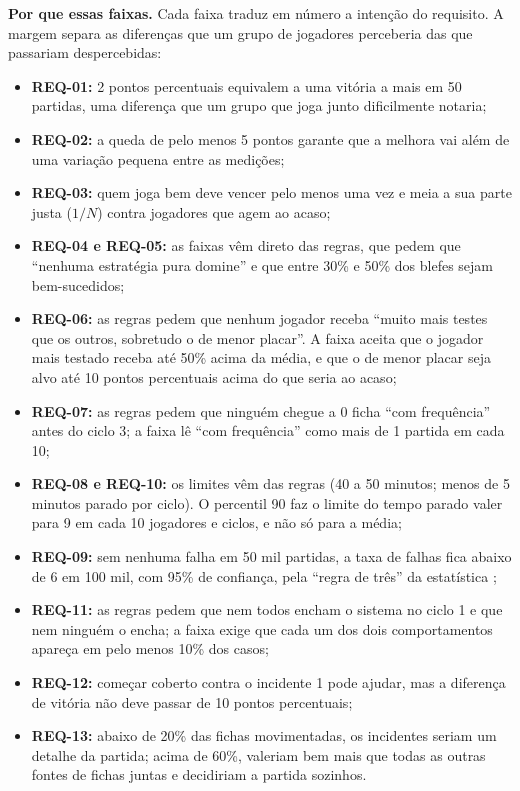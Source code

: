 \textbf{Por que essas faixas.} Cada faixa traduz em número a intenção do requisito. A margem separa as
diferenças que um grupo de jogadores perceberia das que passariam despercebidas:
\begin{itemize}
  \item \textbf{REQ-01:} 2 pontos percentuais equivalem a uma vitória a mais em 50 partidas, uma diferença que um
    grupo que joga junto dificilmente notaria;
  \item \textbf{REQ-02:} a queda de pelo menos 5 pontos garante que a melhora vai além de uma variação pequena
    entre as medições;
  \item \textbf{REQ-03:} quem joga bem deve vencer pelo menos uma vez e meia a sua parte justa ($1/N$) contra
    jogadores que agem ao acaso;
  \item \textbf{REQ-04 e REQ-05:} as faixas vêm direto das regras, que pedem que ``nenhuma estratégia pura
    domine'' e que entre 30\% e 50\% dos blefes sejam bem-sucedidos;
  \item \textbf{REQ-06:} as regras pedem que nenhum jogador receba ``muito mais testes que os outros, sobretudo o
    de menor placar''. A faixa aceita que o jogador mais testado receba até 50\% acima da média, e que o de menor
    placar seja alvo até 10 pontos percentuais acima do que seria ao acaso;
  \item \textbf{REQ-07:} as regras pedem que ninguém chegue a 0 ficha ``com frequência'' antes do ciclo 3; a faixa
    lê ``com frequência'' como mais de 1 partida em cada 10;
  \item \textbf{REQ-08 e REQ-10:} os limites vêm das regras (40 a 50 minutos; menos de 5 minutos parado por
    ciclo). O percentil 90 faz o limite do tempo parado valer para 9 em cada 10 jogadores e ciclos, e não só para
    a média;
  \item \textbf{REQ-09:} sem nenhuma falha em 50 mil partidas, a taxa de falhas fica abaixo de 6 em 100 mil, com
    95\% de confiança, pela ``regra de três'' da estatística \cite{hanley1983};
  \item \textbf{REQ-11:} as regras pedem que nem todos encham o sistema no ciclo 1 e que nem ninguém o encha; a
    faixa exige que cada um dos dois comportamentos apareça em pelo menos 10\% dos casos;
  \item \textbf{REQ-12:} começar coberto contra o incidente 1 pode ajudar, mas a diferença de vitória não deve
    passar de 10 pontos percentuais;
  \item \textbf{REQ-13:} abaixo de 20\% das fichas movimentadas, os incidentes seriam um detalhe da partida; acima
    de 60\%, valeriam bem mais que todas as outras fontes de fichas juntas e decidiriam a partida sozinhos.
\end{itemize}


